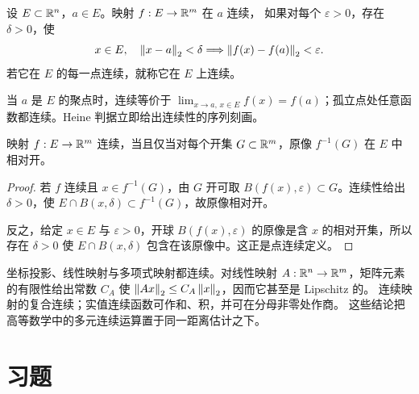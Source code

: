 \begin{definition}[相对连续]
设 \(E\subset\mathbb{R}^n\)，\(a\in E\)。映射 \(f:E\to\mathbb{R}^m\) 在 \(a\) 连续，
如果对每个 \(\varepsilon>0\)，存在 \(\delta>0\)，使
\[
 x\in E,\quad\left\lVert x-a\right\rVert_2<\delta
 \Longrightarrow \left\lVert f(x)-f(a)\right\rVert_2<\varepsilon.
\]
若它在 \(E\) 的每一点连续，就称它在 \(E\) 上连续。
\end{definition}

当 \(a\) 是 \(E\) 的聚点时，连续等价于
\(\lim_{x\to a,\,x\in E}f(x)=f(a)\)；孤立点处任意函数都连续。Heine
判据立即给出连续性的序列刻画。

\begin{theorem}[连续性的开集原像判据]
\label{thm:euclidean-continuity-open-preimage}
映射 \(f:E\to\mathbb{R}^m\) 连续，当且仅当对每个开集
\(G\subset\mathbb{R}^m\)，原像 \(f^{-1}(G)\) 在 \(E\) 中相对开。
\end{theorem}

\begin{proof}
若 \(f\) 连续且 \(x\in f^{-1}(G)\)，由 \(G\) 开可取
\(B(f(x),\varepsilon)\subset G\)。连续性给出 \(\delta>0\)，使
\(E\cap B(x,\delta)\subset f^{-1}(G)\)，故原像相对开。

反之，给定 \(x\in E\) 与 \(\varepsilon>0\)，开球
\(B(f(x),\varepsilon)\) 的原像是含 \(x\) 的相对开集，所以存在
\(\delta>0\) 使
\(E\cap B(x,\delta)\) 包含在该原像中。这正是点连续定义。
\end{proof}

坐标投影、线性映射与多项式映射都连续。对线性映射
\(A:\mathbb{R}^n\to\mathbb{R}^m\)，矩阵元素的有限性给出常数 \(C_A\) 使
\(\left\lVert Ax\right\rVert_2\le C_A\left\lVert x\right\rVert_2\)，因而它甚至是 Lipschitz 的。
连续映射的复合连续；实值连续函数可作和、积，并可在分母非零处作商。
这些结论把高等数学中的多元连续运算置于同一距离估计之下。

\section*{习题}


